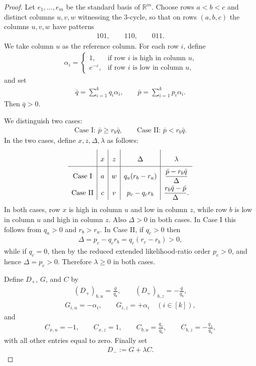 \documentclass{article}
\theoremstyle{plain}
\theoremstyle{definition}
\theoremstyle{plain}
\begin{document}
\begin{proof}
Let $e_1,\dots,e_m$ be the standard basis of $\mathbb{R}^m$. Choose rows $a<b<c$ and distinct columns $u,v,w$ witnessing the $3$-cycle, so that on rows $(a,b,c)$ the columns $u,v,w$ have patterns
\begin{align*}
    101,\qquad 110,\qquad 011.
\end{align*}
We take column $u$ as the reference column. For each row $i$, define
\begin{align*}
    \alpha_i=
    \begin{cases}
        1, & \text{if row $i$ is high in column $u$,}\\
        e^{-\varepsilon}, & \text{if row $i$ is low in column $u$,}
    \end{cases}
\end{align*}
and set
\begin{align*}
    \bar q=\sum_{i=1}^k q_i\alpha_i,\qquad
    \bar p=\sum_{i=1}^k p_i\alpha_i.
\end{align*}
Then $\bar q>0$.

We distinguish two cases:
\begin{align*}
    \text{Case I: }\bar p\ge r_b\bar q,
    \qquad
    \text{Case II: }\bar p<r_b\bar q.
\end{align*}
In the two cases, define $x,z,\Delta,\lambda$ as follows:
\begin{align*}
    \renewcommand{\arraystretch}{2.0}
    \begin{array}{c|c|c|c|c}
         & x & z & \Delta & \lambda \\ \hline
        \text{Case I} & a & w & q_a(r_b-r_a) &
        \dfrac{\bar p-r_b\bar q}{\Delta} \\
        \text{Case II} & c & v & p_c-q_c r_b &
        \dfrac{r_b\bar q-\bar p}{\Delta}.
    \end{array}
\end{align*}
In both cases, row $x$ is high in column $u$ and low in column $z$, while row $b$ is low in column $u$ and high in column $z$. Also $\Delta>0$ in both cases. In Case I this follows from $q_a>0$ and $r_b>r_a$. In Case II, if $q_c>0$ then
\begin{align*}
    \Delta=p_c-q_c r_b=q_c(r_c-r_b)>0,
\end{align*}
while if $q_c=0$, then by the reduced extended likelihood-ratio order $p_c>0$, and hence $\Delta=p_c>0$. Therefore $\lambda\ge 0$ in both cases.

Define $D_+$, $G$, and $C$ by
\begin{align*}
    (D_+)_{b,u}=\frac{\bar q}{q_b},
    \qquad
    (D_+)_{b,z}=-\frac{\bar q}{q_b},
\end{align*}
\begin{align*}
    G_{i,u}=-\alpha_i,\qquad G_{i,z}=+\alpha_i \quad (i\in[k]),
\end{align*}
and
\begin{align*}
    C_{x,u}=-1,\qquad C_{x,z}=1,\qquad
    C_{b,u}=\frac{q_x}{q_b},\qquad C_{b,z}=-\frac{q_x}{q_b},
\end{align*}
with all other entries equal to zero. Finally set
\begin{align*}
    D_-:=G+\lambda C.
\end{align*}


\end{proof}
\end{document}
